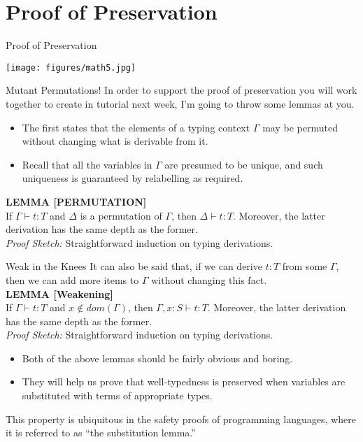 \documentclass[11pt]{beamer}
\begin{document}
\section[Preservation]{Proof of Preservation}
\begin{frame}[fragile=singleslide]{Proof of Preservation}
\begin{center}
\texttt{[image: figures/math5.jpg]}
\end{center}
\end{frame}


\begin{frame}[fragile=singleslide]{Mutant Permutations!}
In order to support the proof of preservation you will work together to create in tutorial next week, I'm going to throw some lemmas at you. 
\begin{itemize}
\item The first states that the elements of a typing context $\Gamma$ may be permuted without changing what is derivable from it.  
\item Recall that all the variables in $\Gamma$ are presumed to be unique, and such uniqueness is guaranteed by relabelling as required.
\end{itemize}
\vspace{1em}
\textbf{LEMMA [PERMUTATION]} \\
If $\Gamma \vdash t : T$ and $\Delta$ is a permutation of $\Gamma$, then $\Delta \vdash t : T$.  Moreover, the latter derivation has the same depth as the former.  \\
\vspace{1em}
\emph{Proof Sketch:} Straightforward induction on typing derivations.
\end{frame}

\begin{frame}[fragile=singleslide]{Weak in the Knees}
It can also be said that, if we can derive $t : T$ from some $\Gamma$, then we can add more items to $\Gamma$ without changing this fact. \\
\vspace{1em}
\textbf{LEMMA [Weakening]} \\
If $\Gamma \vdash t : T$ and $x \notin dom(\Gamma)$, then $\Gamma, x : S \vdash t : T$.  Moreover, the latter derivation has the same depth as the former. \\
\vspace{1em}
\emph{Proof Sketch:} Straightforward induction on typing derivations.
\begin{itemize}
\item Both of the above lemmas should be fairly obvious and boring.  
\item They will help us prove that well-typedness is preserved when variables are substituted with terms of appropriate types.  
\end{itemize}
This property is ubiquitous in the safety proofs of programming languages, where it is referred to as ``the substitution lemma.''
\end{frame}
\end{document}
